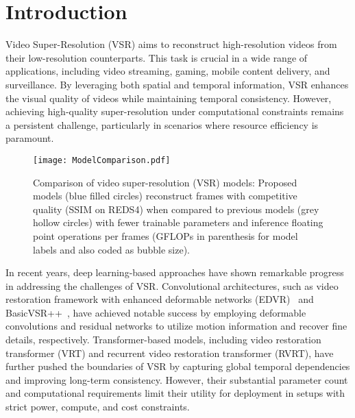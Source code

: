 \documentclass[11pt]{article}
\begin{document}
\section{Introduction}
\label{sec:intro}

Video Super-Resolution (VSR) aims to reconstruct high-resolution videos from their low-resolution counterparts. This task is crucial in a wide range of applications, including video streaming, gaming, mobile content delivery, and surveillance. By leveraging both spatial and temporal information, VSR enhances the visual quality of videos while maintaining temporal consistency. However, achieving high-quality super-resolution under computational constraints remains a persistent challenge, particularly in scenarios where resource efficiency is paramount.



   
\begin{figure}[h]
    \centering
    \texttt{[image: ModelComparison.pdf]}
    \caption{Comparison of video super-resolution (VSR) models: Proposed models (blue filled circles) reconstruct frames with competitive quality (SSIM on REDS4) when compared to previous models (grey hollow circles) with fewer trainable parameters and inference floating point operations per frames (GFLOPs in parenthesis for model labels and also coded as bubble size).}
    \label{fig:model_comparison}
\end{figure}

In recent years, deep learning-based approaches have shown remarkable progress in addressing the challenges of VSR. Convolutional architectures, such as video restoration framework with enhanced deformable networks (EDVR)~\cite{wang2019edvr} and BasicVSR++~\cite{chan2022basicvsr++}, have achieved notable success by employing deformable convolutions and residual networks to utilize motion information and recover fine details, respectively. Transformer-based models, including video restoration transformer (VRT) and recurrent video restoration transformer (RVRT), have further pushed the boundaries of VSR by capturing global temporal dependencies and improving long-term consistency\cite{liang2022vrt}\cite{liang2022rvrt}. However, their substantial parameter count and computational requirements limit their utility for deployment in setups with strict power, compute, and cost constraints.
\end{document}
